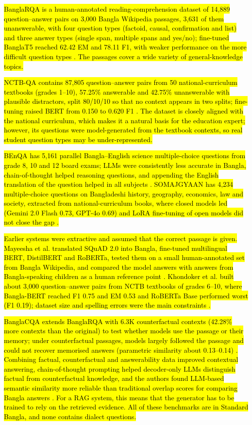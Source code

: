 \hl{BanglaRQA is a human-annotated reading-comprehension dataset of
14,889 question--answer pairs on 3,000 Bangla Wikipedia passages, 3,631
of them unanswerable, with four question types (factoid, causal,
confirmation and list) and three answer types (single span, multiple
spans and yes/no); fine-tuned BanglaT5 reached 62.42 EM and 78.11 F1,
with weaker performance on the more difficult question types \cite{ekram2022banglarqa}.
The passages cover a wide variety of general-knowledge topics.}

\hl{NCTB-QA contains 87,805 question--answer pairs from 50
national-curriculum textbooks (grades 1--10), 57.25\% answerable and
42.75\% unanswerable with plausible distractors, split 80/10/10 so that
no context appears in two splits; fine-tuning raised BERT from 0.150 to
0.620 F1 \cite{nctbqa}. The dataset is closely aligned with the national
curriculum, which makes it a natural basis for the education expert;
however, its questions were model-generated from the textbook contexts,
so real student question types may be under-represented.}

\hl{BEnQA has 5,161 parallel Bangla--English science multiple-choice
questions from grade 8, 10 and 12 board exams; LLMs were consistently
less accurate in Bangla, chain-of-thought helped reasoning questions,
and appending the English translation of the question helped in all
subjects \cite{shafayat2024benqa}. SOMAJGYAAN has 4,234 multiple-choice questions on
Bangladeshi history, geography, economics, law and society, extracted
from national-curriculum books, where closed models led (Gemini 2.0
Flash 0.73, GPT-4o 0.69) and LoRA fine-tuning of open models did not
close the gap \cite{shifa2025somajgyaan}.}

\hl{Earlier systems were extractive and assumed that the correct passage
is given. Mayeesha et al. translated SQuAD 2.0 into Bangla, fine-tuned
multilingual BERT, DistilBERT and RoBERTa, tested them on a small
human-annotated set from Bangla Wikipedia, and compared the model
answers with answers from Bangla-speaking children as a human reference
point \cite{mayeesha2021bengaliqa}. Khondoker et al. built about 3,000 question--answer
pairs from NCTB textbooks of grades 6--10, where Bangla-BERT reached F1
0.75 and EM 0.53 and RoBERTa Base performed worst (F1 0.19); dataset
size and spelling errors were the main constraints \cite{khondoker2024unlocking}.}

\hl{BanglaCQA extends BanglaRQA with 6.3K counterfactual contexts
(42.28\% more contexts than the original) to test whether models use the
passage or their memory; under counterfactual passages, models largely
followed the passage and could not recover memorised answers (parametric
similarity about 0.13--0.14) \cite{azmary2026banglacqa}. Combining factual, counterfactual
and answerability data improved contextual answering, chain-of-thought
prompting helped decoder-only LLMs distinguish factual from
counterfactual knowledge, and the authors found LLM-based semantic
similarity more reliable than traditional overlap scores for comparing
Bangla answers \cite{azmary2026banglacqa}. For a RAG system, this means that the generator
has to be trained to rely on the retrieved evidence. All of these
benchmarks are in Standard Bangla, and none contains dialect questions.}

